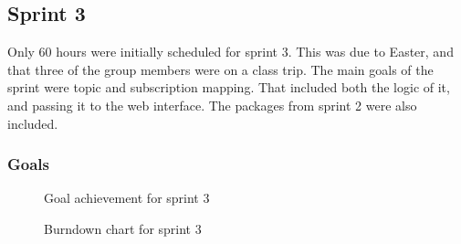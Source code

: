 \subsection{Sprint 3}

Only 60 hours were initially scheduled for sprint 3. This was due to Easter, and that three of the group members were on a class trip. The main goals of the sprint were topic and subscription mapping. That included both the logic of it, and passing it to the web interface. The packages from sprint 2 were also included.

\subsubsection{Goals}

\begin{center}
  \begin{figure}[ht!]
    \caption{Goal achievement for sprint 3}
    \label{fig:sprint 3, goals}
  \end{figure}
\end{center}

\clearpage

\begin{center}
  \begin{figure}[ht!]
    \caption{Burndown chart for sprint 3}
    \label{fig:sprint 3, burndown}
  \end{figure}
\end{center}

